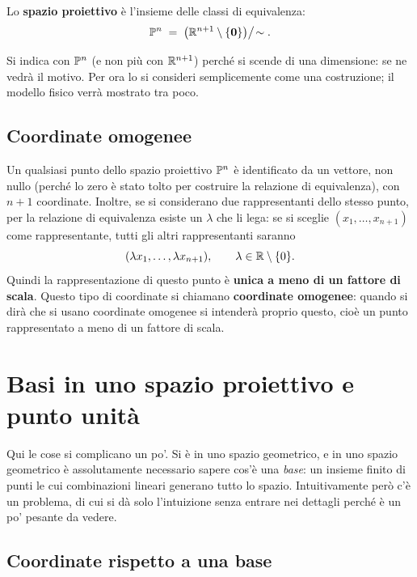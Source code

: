 \begin{definizione}
Lo \textbf{spazio proiettivo} è l'insieme delle classi di equivalenza:
\[
  \mathbb{P}^{n} \;=\; \bigl(\mathbb{R}^{n+1}\setminus\{\mathbf{0}\}\bigr)\big/\!\sim .
\]
\end{definizione}

Si indica con $\mathbb{P}^n$ (e non più con $\mathbb{R}^{n+1}$) perché si scende di una dimensione: se ne vedrà il motivo. Per ora lo si consideri semplicemente come una costruzione; il modello fisico verrà mostrato tra poco.

\subsection{Coordinate omogenee}

Un qualsiasi punto dello spazio proiettivo $\mathbb{P}^n$ è identificato da un vettore, non nullo (perché lo zero è stato tolto per costruire la relazione di equivalenza), con $n+1$ coordinate. Inoltre, se si considerano due rappresentanti dello stesso punto, per la relazione di equivalenza esiste un $\lambda$ che li lega: se si sceglie $(x_1,\dots,x_{n+1})$ come rappresentante, tutti gli altri rappresentanti saranno
\[
  (\lambda x_1,\dots,\lambda x_{n+1}),\qquad \lambda\in\mathbb{R}\setminus\{0\}.
\]
Quindi la rappresentazione di questo punto è \textbf{unica a meno di un fattore di scala}. Questo tipo di coordinate si chiamano \textbf{coordinate omogenee}: quando si dirà che si usano coordinate omogenee si intenderà proprio questo, cioè un punto rappresentato a meno di un fattore di scala.

\section{Basi in uno spazio proiettivo e punto unità}

Qui le cose si complicano un po'. Si è in uno spazio geometrico, e in uno spazio geometrico è assolutamente necessario sapere cos'è una \emph{base}: un insieme finito di punti le cui combinazioni lineari generano tutto lo spazio. Intuitivamente però c'è un problema, di cui si dà solo l'intuizione senza entrare nei dettagli perché è un po' pesante da vedere.

\subsection{Coordinate rispetto a una base}

